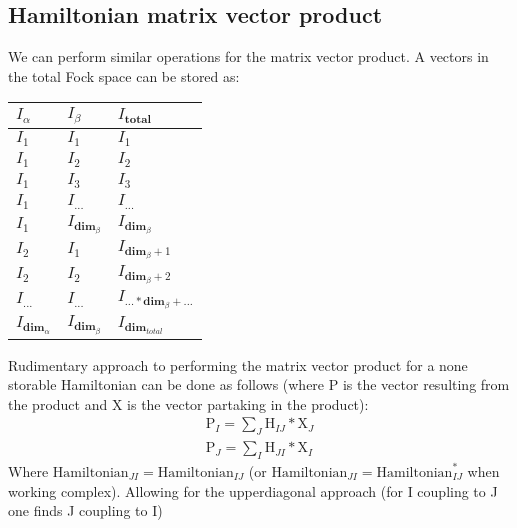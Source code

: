\subsection{Hamiltonian matrix vector product}
We can perform similar operations for the matrix vector product.
A vectors in the total Fock space can be stored as:
\begin{center}
\begin{tabular}{|l|l||l|}
\hline
$I_{\alpha}$ & $I_{\beta}$ & $I_{\textbf{total}}$ \\ \hline
$I_1$ & $I_1$ & $I_1$ \\ \hline
$I_1$ & $I_2$ & $I_2$ \\ \hline
$I_1$ & $I_3$ & $I_3$ \\ \hline
$I_1$ & $I_{...}$ & $I_{...}$ \\ \hline
$I_1$ & $I_{\textbf{dim}_\beta}$ & $I_{\textbf{dim}_\beta}$ \\ \hline
$I_2$ & $I_{1}$ & $I_{\textbf{dim}_\beta + 1}$ \\ \hline
$I_2$ & $I_{2}$ & $I_{\textbf{dim}_\beta + 2}$ \\ \hline
$I_{...}$ & $I_{...}$ & $I_{... * \textbf{dim}_\beta + ...}$ \\ \hline
$I_{\textbf{dim}_\alpha}$ & $I_{\textbf{dim}_\beta}$ & $I_{\textbf{dim}_{total}}$ \\ \hline
\end{tabular}
\end{center}
Rudimentary approach to performing the matrix vector product for a none storable Hamiltonian can be done as follows (where P is the vector resulting from the product and X is the vector partaking in the product):
\begin{align}
  \text{P}_{I} = \sum_J \text{H}_{IJ} * \text{X}_{J} \\
  \text{P}_{J} = \sum_I \text{H}_{JI} * \text{X}_{I}
\end{align}
Where $\text{Hamiltonian}_{JI} = \text{Hamiltonian}_{IJ}$ (or $\text{Hamiltonian}_{JI} = \text{Hamiltonian}_{IJ}^*$ when working complex). Allowing for the upperdiagonal approach (for I coupling to J one finds J coupling to I)

